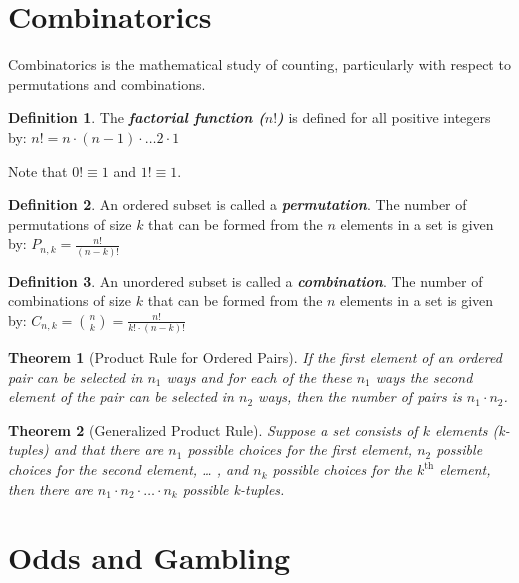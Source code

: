 \documentclass[
  11pt,
]{book}
\newtheorem{theorem}{Theorem}[chapter]
\theoremstyle{definition}
\newtheorem{definition}{Definition}[chapter]
\theoremstyle{definition}
\theoremstyle{definition}
\theoremstyle{definition}
\theoremstyle{remark}
\begin{document}
\hypertarget{combinatorics}{%
\section{Combinatorics}\label{combinatorics}}

Combinatorics is the mathematical study of counting, particularly with respect to permutations and combinations.

\begin{definition}
The \textbf{\emph{factorial function (\(n!\))}} is defined for all positive integers by: \(n! = n \cdot (n-1) \cdot \ldots 2 \cdot 1\)
\end{definition}

Note that \(0! \equiv 1\) and \(1! \equiv 1\).

\begin{definition}
An ordered subset is called a \textbf{\emph{permutation}}. The number of permutations of size \(k\) that can be formed from the \(n\) elements in a set is given by: \(P_{n,k} = \frac{n!}{(n-k)!}\)
\end{definition}

\begin{definition}
An unordered subset is called a \textbf{\emph{combination}}. The number of combinations of size \(k\) that can be formed from the \(n\) elements in a set is given by: \(C_{n,k} = {n \choose k} = \frac{n!}{k! \cdot (n-k)!}\)
\end{definition}

\begin{theorem}[Product Rule for Ordered Pairs]
If the first element of an ordered pair can be selected in \(n_1\) ways and for each of the these \(n_1\) ways the second element of the pair can be selected in \(n_2\) ways, then the number of pairs is \(n_1 \cdot n_2\).
\end{theorem}

\begin{theorem}[Generalized Product Rule]
Suppose a set consists of \(k\) elements (k-tuples) and that there are \(n_1\) possible choices for the first element, \(n_2\) possible choices for the second element, \ldots{} , and \(n_k\) possible choices for the \(k^\text{th}\) element, then there are \(n_1 \cdot n_2 \cdot \ldots \cdot n_k\) possible k-tuples.
\end{theorem}

\hypertarget{odds-and-gambling}{%
\section{Odds and Gambling}\label{odds-and-gambling}}
\end{document}
